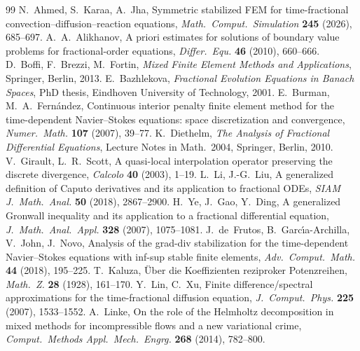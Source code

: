 \documentclass[11pt,a4paper]{article}
\numberwithin{equation}{section}
\theoremstyle{plain}
\theoremstyle{definition}
\theoremstyle{remark}
\begin{document}
\begin{thebibliography}{99}
 N.~Ahmed, S.~Karaa, A.~Jha, Symmetric stabilized FEM for time-fractional convection--diffusion--reaction equations, \emph{Math.\ Comput.\ Simulation} \textbf{245} (2026), 685--697.
 A.~A.~Alikhanov, A priori estimates for solutions of boundary value problems for fractional-order equations, \emph{Differ.\ Equ.} \textbf{46} (2010), 660--666.
 D.~Boffi, F.~Brezzi, M.~Fortin, \emph{Mixed Finite Element Methods and Applications}, Springer, Berlin, 2013.
{\color{blue}
 E.~Bazhlekova, \emph{Fractional Evolution Equations in Banach Spaces}, PhD thesis, Eindhoven University of Technology, 2001.
 E.~Burman, M.~A.~Fern\'andez, Continuous interior penalty finite element method for the time-dependent Navier--Stokes equations: space discretization and convergence, \emph{Numer.\ Math.} \textbf{107} (2007), 39--77.
 K.~Diethelm, \emph{The Analysis of Fractional Differential Equations}, Lecture Notes in Math.\ 2004, Springer, Berlin, 2010.
 V.~Girault, L.~R.~Scott, A quasi-local interpolation operator preserving the discrete divergence, \emph{Calcolo} \textbf{40} (2003), 1--19.
 L.~Li, J.-G.~Liu, A generalized definition of Caputo derivatives and its application to fractional ODEs, \emph{SIAM J.\ Math.\ Anal.} \textbf{50} (2018), 2867--2900.
 H.~Ye, J.~Gao, Y.~Ding, A generalized Gronwall inequality and its application to a fractional differential equation, \emph{J.\ Math.\ Anal.\ Appl.} \textbf{328} (2007), 1075--1081.
}
 J.~de~Frutos, B.~Garc\'{\i}a-Archilla, V.~John, J.~Novo, Analysis of the grad-div stabilization for the time-dependent Navier--Stokes equations with inf-sup stable finite elements, \emph{Adv.\ Comput.\ Math.} \textbf{44} (2018), 195--225.
 T.~Kaluza, \"Uber die Koeffizienten reziproker Potenzreihen, \emph{Math.\ Z.} \textbf{28} (1928), 161--170.
 Y.~Lin, C.~Xu, Finite difference/spectral approximations for the time-fractional diffusion equation, \emph{J.\ Comput.\ Phys.} \textbf{225} (2007), 1533--1552.
 A.~Linke, On the role of the Helmholtz decomposition in mixed methods for incompressible flows and a new variational crime, \emph{Comput.\ Methods Appl.\ Mech.\ Engrg.} \textbf{268} (2014), 782--800.
\end{thebibliography}
\end{document}
